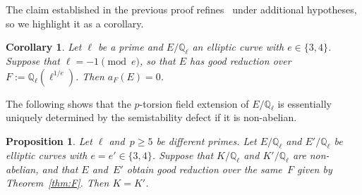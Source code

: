 \documentclass[12pt]{amsart}
\numberwithin{equation}{section}
\newtheorem{proposition}[equation]{Proposition}
\newtheorem{corollary}[equation]{Corollary}
\theoremstyle{definition}
\newcommand{\Q}{\mathbb{Q}}
\begin{document}
The claim established in the previous proof refines~\cite[Theorem~3.2]{doks} under additional hypotheses, so we highlight it as a corollary.

\begin{corollary} \label{cor:al0}
    Let $\ell$ be a prime and $E/\Q_\ell$ an elliptic curve with $e \in \{3,4\} $. Suppose that $\ell = -1 \pmod e$, so that $E$ has good reduction over~$F:=\Q_\ell(\ell^{1/e})$.
    Then  $a_F(E)=0$.
\end{corollary}
 
The following shows that the $p$-torsion field extension of $E/\Q_\ell$ is essentially uniquely determined by the semistability defect if it is non-abelian.

\begin{proposition}\label{prop:samefields}
Let $\ell$ and~$p \geq 5$ be different primes.
    Let $E/\Q_\ell$ and $E'/\Q_\ell $ be elliptic curves with $e=e'\in \{3,4\}$. 
    Suppose that $K/\Q_\ell$ and $K'/\Q_\ell$ are non-abelian, and that $E$ and~$E'$ obtain good reduction over the same~$F$ given by Theorem~\ref{thm:F}.  Then $K=K'$.
\end{proposition}
\end{document}
